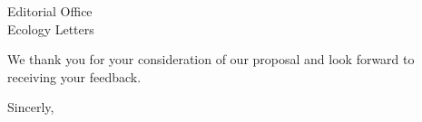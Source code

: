 \documentclass{letter}
\begin{document}
\begin{letter}{Editorial Office \\
Ecology Letters}


\newpage

We thank you for your consideration of our proposal and look forward to receiving your feedback.

\closing{Sincerly,}



\end{letter}
\end{document}
